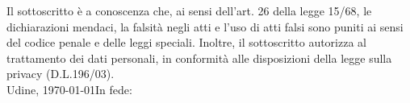 \documentclass[10pt,a4paper,italian]{moderncv}
\begin{document}
%
%   
 
\vspace{\fill}
{\footnotesize\noindent
Il sottoscritto è a conoscenza che, ai sensi dell'art. 26 della legge 15/68, le dichiarazioni mendaci, la falsità negli atti e l'uso di atti falsi sono puniti ai sensi del codice penale e delle leggi speciali. Inoltre, il sottoscritto autorizza al trattamento dei dati personali, in conformità alle disposizioni della legge sulla privacy  (D.L.196/03).}
\vspace*{0.8cm}\\
Udine, \today\hfill In fede: 
\end{document}
